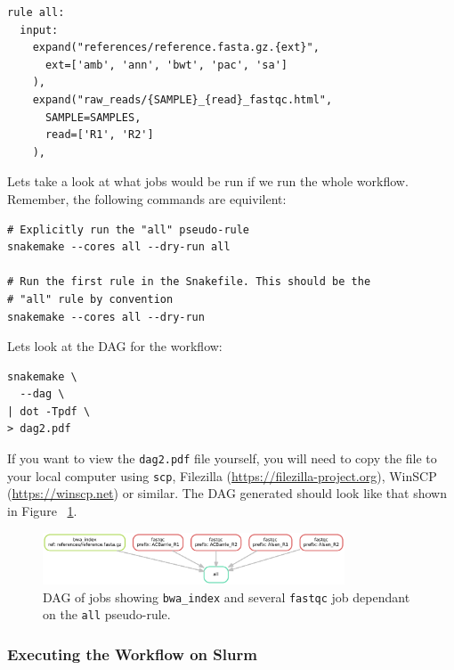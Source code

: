 \begin{lstlisting}
rule all:
  input:
    expand("references/reference.fasta.gz.{ext}",
      ext=['amb', 'ann', 'bwt', 'pac', 'sa']
    ),
    expand("raw_reads/{SAMPLE}_{read}_fastqc.html",
      SAMPLE=SAMPLES,
      read=['R1', 'R2']
    ),
\end{lstlisting}

Lets take a look at what jobs would be run if we run the whole workflow.
Remember, the following commands are equivilent:

\begin{lstlisting}
# Explicitly run the "all" pseudo-rule
snakemake --cores all --dry-run all

# Run the first rule in the Snakefile. This should be the
# "all" rule by convention
snakemake --cores all --dry-run
\end{lstlisting}

Lets look at the DAG for the workflow:

\begin{lstlisting}
snakemake \
  --dag \
| dot -Tpdf \
> dag2.pdf
\end{lstlisting}

\begin{warning}

If you want to view the \texttt{dag2.pdf} file yourself, you will need to copy the file to your local computer using \texttt{scp}, Filezilla (\url{https://filezilla-project.org}), WinSCP (\url{https://winscp.net}) or similar.
The DAG generated should look like that shown in Figure ~\ref{fig:dag2}.

\end{warning}

\begin{figure}[H]
\centering
\includegraphics[width=0.8\textwidth]{handout/dag2.pdf}
\caption{DAG of jobs showing \texttt{bwa\_index} and several \texttt{fastqc} job dependant on the \texttt{all} pseudo-rule.}
\label{fig:dag2}
\end{figure}


\subsubsection{Executing the Workflow on Slurm}

